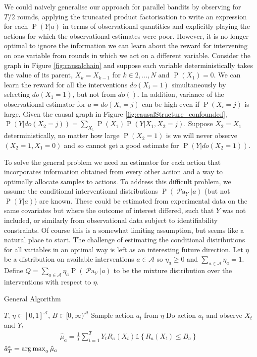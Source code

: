 \documentclass[11pt,a4paper,twoside]{report}
\newcommand{\calA}{\mathcal A}
\newcommand{\set}[1]{\left\{#1\right\}}
\newcommand{\ind}[1]{\mathds{1}\!\!\set{#1}}
\newcommand{\argmax}{\operatornamewithlimits{arg\,max}}
\newcommand{\eq}[1]{\begin{align*}#1\end{align*}}
\renewcommand{\P}[1]{\operatorname{P}\left(#1\right)}
\newcommand{\parents}[1]{\operatorname{\mathcal{P}a}_{#1}}
\theoremstyle{plain}
\theoremstyle{definition}
\begin{document}
We could naively generalise our approach for parallel bandits by observing for $T/2$ rounds, applying the truncated product factorisation to 
write an expression for each $\P{Y|a}$ in terms of observational quantities and explicitly playing the actions for which the observational 
estimates were poor. However, it is no longer optimal to ignore the information we can learn about the reward for intervening on one variable 
from rounds in which we act on a different variable. Consider the graph in Figure \ref{fig:causalchain} and suppose each variable deterministically 
takes the value of its parent, $X_k = X_{k-1}$ for $k\in {2,\ldots,N}$ and $\P{X_1} = 0$. We can learn the reward for all the interventions $do(X_i = 1)$ 
simultaneously by selecting $do(X_1 = 1)$, but not from $do()$. In addition, variance of the observational estimator for $a = do(X_i = j)$ can be 
high even if $\P{X_i = j}$ is large. Given the causal graph in Figure \ref{fig:causalStructure_confounded}, $\P{Y|do(X_2= j)} = \sum_{X_1}\P{X_1}\P{Y|X_1, X_2 = j}$. 
Suppose $X_2 = X_1$ deterministically, no matter how large $\P{X_2 = 1}$ is we will never observe $(X_2=1,X_1 = 0)$ and so cannot 
get a good estimate for $\P{Y|do(X_2=1)}$. 

To solve the general problem we need an estimator for each action that incorporates information obtained from every other action and a way to optimally 
allocate samples to actions. To address this difficult problem, we assume the conditional interventional distributions $\P{\parents{Y}|a}$ (but not $\P{Y|a}$) 
are known. These could be estimated from experimental data on the same covariates but where the outcome of interest differed, such that $Y$ was not included, 
or similarly from observational data subject to identifiability constraints. Of course this is a somewhat limiting assumption, but seems like a natural place to
start. The challenge of estimating the conditional distributions for all variables in an optimal way is left as an interesting future direction.
Let $\eta$ be a distribution on available interventions $a \in \calA$ so $\eta_a \geq 0$ and $\sum_{a \in \calA} \eta_a = 1$. 
Define $Q = \sum_{a \in \calA} \eta_a \P{\parents{Y}|a}$ to be the mixture distribution over the interventions with respect to $\eta$.



\begin{algorithm}[H]
\caption{General Algorithm}\label{alg:general}
\begin{algorithmic}
 $T$, $\eta \in [0,1]^{\calA}$, $B \in [0,\infty)^{\calA}$
\FOR{$t \in \set{1,\ldots,T}$}
\STATE Sample action $a_t$ from $\eta$
\STATE Do action $a_t$ and observe $X_t$ and $Y_t$
\ENDFOR
\FOR{$a \in \calA$}
\STATE
\eq {
\hat \mu_a =  \frac{1}{T} \sum_{t=1}^T Y_t R_a(X_t)  \ind{R_a(X_t) \leq B_a}
}
\ENDFOR
{} $\hat a^*_T = \argmax_a \hat \mu_a$
\end{algorithmic}
\end{algorithm}
\end{document}
